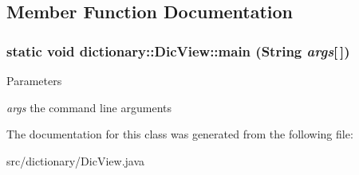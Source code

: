 \subsection{Member Function Documentation}
\hypertarget{classdictionary_1_1_dic_view_a27b0de7ad84678aff9327bcbdcf7e14b}{
\subsubsection[{main}]{\setlength{\rightskip}{0pt plus 5cm}static void dictionary::DicView::main (String {\em args}\mbox{[}$\,$\mbox{]})}}
\label{classdictionary_1_1_dic_view_a27b0de7ad84678aff9327bcbdcf7e14b}

\begin{DoxyParams}{Parameters}
\item[{\em args}]the command line arguments \end{DoxyParams}


The documentation for this class was generated from the following file:\begin{DoxyCompactItemize}
\item 
src/dictionary/DicView.java\end{DoxyCompactItemize}
